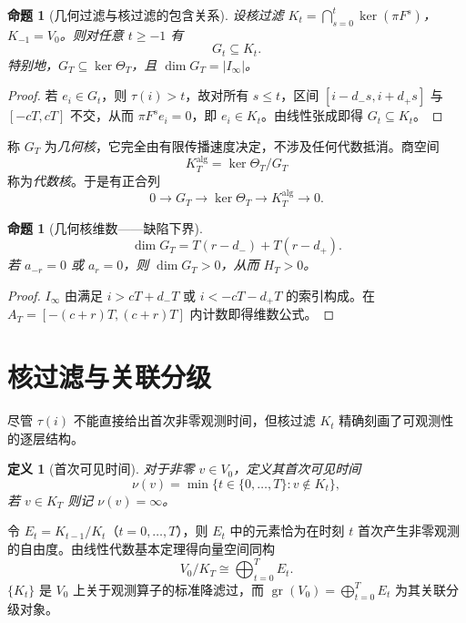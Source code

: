\documentclass[11pt,a4paper]{ctexart}
\newtheorem{proposition}[theorem]{命题}
\newtheorem{definition}[theorem]{定义}
\DeclareMathOperator{\gr}{gr}
\begin{document}
\begin{proposition}[几何过滤与核过滤的包含关系]\label{prop:geo_inclusion}
设核过滤 \(K_t = \bigcap_{s=0}^{t}\ker(\pi F^s)\)，\(K_{-1}=V_0\)。则对任意 \(t\ge -1\) 有
\[
G_t \subseteq K_t .
\]
特别地，\(G_T\subseteq \ker\Theta_T\)，且 \(\dim G_T = |I_\infty|\)。
\end{proposition}
\begin{proof}
若 \(e_i\in G_t\)，则 \(\tau(i)>t\)，故对所有 \(s\le t\)，区间 \([i-d_-s,i+d_+s]\) 与 \([-cT,cT]\) 不交，从而 \(\pi F^s e_i =0\)，即 \(e_i\in K_t\)。由线性张成即得 \(G_t\subseteq K_t\)。
\end{proof}

称 \(G_T\) 为\emph{几何核}，它完全由有限传播速度决定，不涉及任何代数抵消。商空间
\[
K_T^{\mathrm{alg}} = \ker\Theta_T / G_T
\]
称为\emph{代数核}。于是有正合列
\[
0 \longrightarrow G_T \longrightarrow \ker\Theta_T \longrightarrow K_T^{\mathrm{alg}} \longrightarrow 0.
\]

\begin{proposition}[几何核维数——缺陷下界]\label{prop:geo_kernel}
\[
\dim G_T = T(r-d_-) + T(r-d_+).
\]
若 \(a_{-r}=0\) 或 \(a_r=0\)，则 \(\dim G_T>0\)，从而 \(H_T>0\)。
\end{proposition}
\begin{proof}
\(I_\infty\) 由满足 \(i > cT + d_-T\) 或 \(i < -cT - d_+T\) 的索引构成。在 \(A_T = [-(c+r)T, (c+r)T]\) 内计数即得维数公式。
\end{proof}

\section{核过滤与关联分级}
尽管 \(\tau(i)\) 不能直接给出首次非零观测时间，但核过滤 \(K_t\) 精确刻画了可观测性的逐层结构。

\begin{definition}[首次可见时间]
对于非零 \(v\in V_0\)，定义其\emph{首次可见时间}
\[
\nu(v) = \min\{ t\in\{0,\dots,T\} : v\notin K_t \},
\]
若 \(v\in K_T\) 则记 \(\nu(v)=\infty\)。
\end{definition}

令 \(E_t = K_{t-1}/K_t\)（\(t=0,\dots,T\)），则 \(E_t\) 中的元素恰为在时刻 \(t\) 首次产生非零观测的自由度。由线性代数基本定理得向量空间同构
\begin{equation}\label{eq:decompose}
    V_0/K_T \cong \bigoplus_{t=0}^T E_t.
\end{equation}
\(\{K_t\}\) 是 \(V_0\) 上关于观测算子的标准降滤过，而 \(\gr(V_0)=\bigoplus_{t=0}^T E_t\) 为其关联分级对象。
\end{document}
